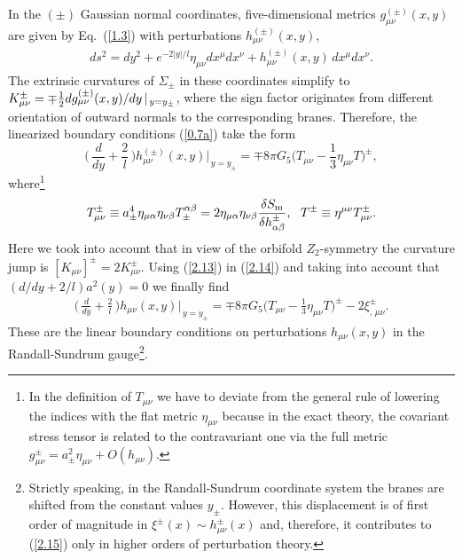 \documentclass[a4paper,preprint,nofootinbib,
                 showpacs,preprintnumbers,amsmath,amssymb]{revtex4}
\begin{document}
In the $(\pm)$ Gaussian normal coordinates, five-dimensional 
metrics $g^{(\pm)}_{\mu\nu}(x,y)$ are given by Eq.~(\ref{1.3}) with 
perturbations $h^{(\pm)}_{\mu\nu}(x,y)$, 
    \begin{eqnarray} 
     ds^2=dy^2+e^{-2|y|/l}\eta_{\mu\nu}dx^\mu dx^\nu 
     +h^{(\pm)}_{\mu\nu}(x,y)\,dx^\mu dx^\nu.          \label{1.3a} 
     \end{eqnarray} 
The extrinsic curvatures of $\Sigma_\pm$ in these coordinates simplify 
to 
    $K_{\mu\nu}^\pm=\mp{1\over2} 
    dg^{(\pm)}_{\mu\nu}(x,y)/dy\,|_{\,y=y_\pm}$, 
where the sign factor originates from different orientation of 
outward normals to the corresponding branes. Therefore, the linearized 
boundary conditions (\ref{0.7a}) take the form 
    \begin{equation} 
    \Big(\,\frac d{dy} + \frac{2}{l}\,\Big) 
    h_{\mu \nu}^{(\pm)}(x,y)\Big|_{\,y=y_\pm} 
    =\mp 8\pi G_5 
    \Big(T_{\mu\nu}-\frac13\eta_{\mu \nu}T\Big)^\pm, \label{2.14} 
    \end{equation} 
where\footnote{In the definition of $T_{\mu\nu}$ we have to 
deviate from the general rule of lowering the indices with the 
flat metric $\eta_{\mu\nu}$ because in the exact theory, the covariant 
stress tensor is related to the contravariant one via the full 
metric $g_{\mu\nu}^\pm=a^2_\pm\eta_{\mu\nu}+O(h_{\mu\nu})$.} 
    \begin{eqnarray} 
    T^\pm_{\mu\nu}\equiv 
    a_\pm^4\eta_{\mu\alpha}\eta_{\nu\beta} 
    T^{\alpha\beta}_\pm= 
    2\eta_{\mu\alpha}\eta_{\nu\beta} 
    \frac{\delta 
    S_{\rm m}}{\delta h^\pm_{\alpha\beta}},\,\,\,\, 
    T^\pm\equiv\eta^{\mu\nu}T^\pm_{\mu\nu}. \label{2.14a} 
    \end{eqnarray} 
Here we took into account that in view of the orbifold 
$Z_2$-symmetry the curvature jump is 
$[K_{\mu\nu}]^\pm=2K_{\mu\nu}^\pm$. Using (\ref{2.13}) in 
(\ref{2.14}) and taking into account that $(d/dy + 2/l) a^2(y)=0$ 
we finally find 
    \begin{eqnarray} 
    \Big(\,\frac d{dy}+\frac{2}{l}\,\Big) 
    h_{\mu \nu}(x,y)\Big|_{\,y=y_\pm} = 
    \mp 8\pi G_5 \Big( T_{\mu \nu} - 
    \frac13 \eta_{\mu \nu} 
    T \Big)^\pm-2 \xi^\pm_{,\,\mu \nu}.               \label{2.15} 
    \end{eqnarray} 
These are the linear boundary conditions on perturbations $h_{\mu 
\nu}(x,y)$ in the Randall-Sundrum gauge\footnote{Strictly 
speaking, in the Randall-Sundrum coordinate system the branes are 
shifted from the constant values $y_\pm$. However, this displacement 
is of first order of magnitude in $\xi^\pm(x)\sim 
h^\pm_{\mu\nu}(x)$ and, therefore, it contributes to (\ref{2.15}) 
only in higher orders of perturbation theory.}. 
 
\end{document}
